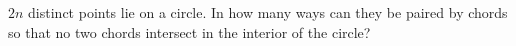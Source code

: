 $2n$ distinct points lie on a circle. In how many ways can they be paired by chords so that no two chords intersect in the interior of the circle?
